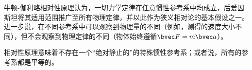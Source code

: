 
\begin{issues}
\issueDraft
\end{issues}


牛顿-伽利略相对性原理认为，一切力学定律在任意惯性参考系中均成立，后爱因斯坦将其适用范围推广至所有物理定律，并以此作为狭义相对论的基本假设之一。进一步说，在不同参考系中可以观察到物理量的不同（例如，测得的速度大小不同），但不会观察到物理定律的不同（物体始终遵循$\bvec F=m \bvec a$）。

相对性原理意味着不存在一个“绝对静止的”的特殊惯性参考系；或者说，所有的参考系都是平等的。
